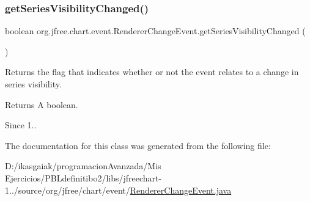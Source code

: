 \subsubsection{\texorpdfstring{get\+Series\+Visibility\+Changed()}{getSeriesVisibilityChanged()}}
{\footnotesize\ttfamily boolean org.\+jfree.\+chart.\+event.\+Renderer\+Change\+Event.\+get\+Series\+Visibility\+Changed (\begin{DoxyParamCaption}{ }\end{DoxyParamCaption})}

Returns the flag that indicates whether or not the event relates to a change in series visibility.

\begin{DoxyReturn}{Returns}
A boolean.
\end{DoxyReturn}
\begin{DoxySince}{Since}
1.. 
\end{DoxySince}


The documentation for this class was generated from the following file\+:\begin{DoxyCompactItemize}
\item 
D\+:/ikasgaiak/programacion\+Avanzada/\+Mis Ejercicios/\+P\+B\+Ldefinitibo2/libs/jfreechart-\/1../source/org/jfree/chart/event/\mbox{\hyperlink{_renderer_change_event_8java}{Renderer\+Change\+Event.\+java}}\end{DoxyCompactItemize}
